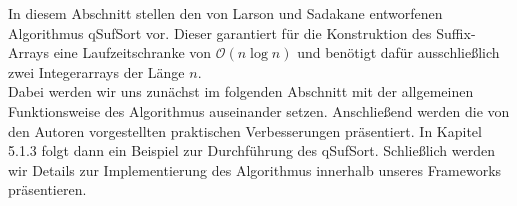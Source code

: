 \newtheorem{lemma}{Lemma}
In diesem Abschnitt stellen den von Larson und Sadakane entworfenen Algorithmus qSufSort\cite{saca:1} vor. 
Dieser garantiert für die Konstruktion des Suffix-Arrays eine Laufzeitschranke von $\mathcal{O}(n\log n)$ und benötigt dafür ausschließlich zwei Integerarrays der Länge $n$.\\
Dabei werden wir uns zunächst im folgenden Abschnitt mit der allgemeinen Funktionsweise des Algorithmus auseinander setzen. Anschließend werden die von den Autoren vorgestellten praktischen Verbesserungen präsentiert. In Kapitel 5.1.3 folgt dann ein Beispiel zur Durchführung des qSufSort. Schließlich werden wir Details zur Implementierung des Algorithmus innerhalb unseres Frameworks präsentieren.
